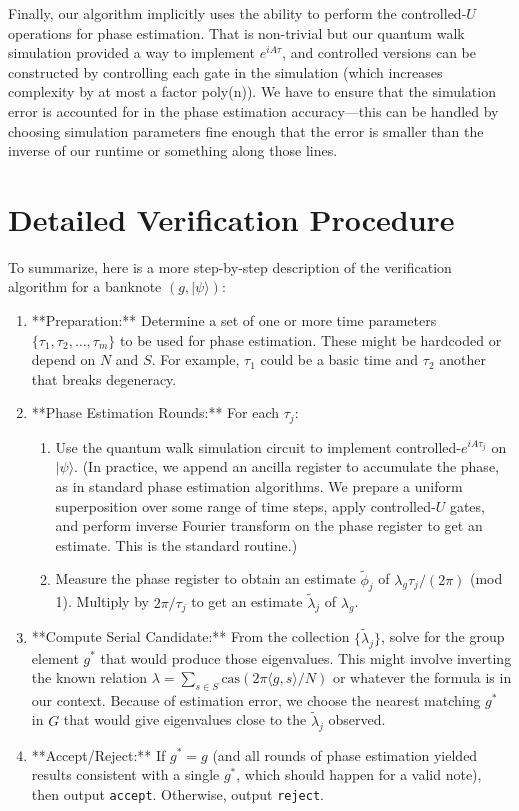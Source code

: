 \documentclass[11pt]{article}
\theoremstyle{definition}
\newcommand{\cas}{\mathrm{cas}}
\begin{document}
    Finally, our algorithm implicitly uses the ability to perform the controlled-$U$ operations for phase estimation. That is non-trivial but our quantum walk simulation provided a way to implement $e^{iA\tau}$, and controlled versions can be constructed by controlling each gate in the simulation (which increases complexity by at most a factor poly(n)). We have to ensure that the simulation error is accounted for in the phase estimation accuracy—this can be handled by choosing simulation parameters fine enough that the error is smaller than the inverse of our runtime or something along those lines.

    \section{Detailed Verification Procedure}
    To summarize, here is a more step-by-step description of the verification algorithm for a banknote $(g, |\psi\rangle)$:
    \begin{enumerate}
        \item **Preparation:** Determine a set of one or more time parameters $\{\tau_1, \tau_2, \dots, \tau_m\}$ to be used for phase estimation. These might be hardcoded or depend on $N$ and $S$. For example, $\tau_1$ could be a basic time and $\tau_2$ another that breaks degeneracy.
        \item **Phase Estimation Rounds:** For each $\tau_j$:
        \begin{enumerate}
            \item Use the quantum walk simulation circuit to implement controlled-$e^{iA \tau_j}$ on $|\psi\rangle$. (In practice, we append an ancilla register to accumulate the phase, as in standard phase estimation algorithms. We prepare a uniform superposition over some range of time steps, apply controlled-$U$ gates, and perform inverse Fourier transform on the phase register to get an estimate. This is the standard routine.)
            \item Measure the phase register to obtain an estimate $\tilde{\phi}_j$ of $\lambda_g \tau_j / (2\pi)$ (mod 1). Multiply by $2\pi/\tau_j$ to get an estimate $\tilde{\lambda}_j$ of $\lambda_g$.
        \end{enumerate}
        \item **Compute Serial Candidate:** From the collection $\{\tilde{\lambda}_j\}$, solve for the group element $g^*$ that would produce those eigenvalues. This might involve inverting the known relation $\lambda = \sum_{s\in S}\cas(2\pi \langle g, s\rangle/N)$ or whatever the formula is in our context. Because of estimation error, we choose the nearest matching $g^*$ in $G$ that would give eigenvalues close to the $\tilde{\lambda}_j$ observed.
        \item **Accept/Reject:** If $g^* = g$ (and all rounds of phase estimation yielded results consistent with a single $g^*$, which should happen for a valid note), then output \texttt{accept}. Otherwise, output \texttt{reject}.
    \end{enumerate}
\end{document}
